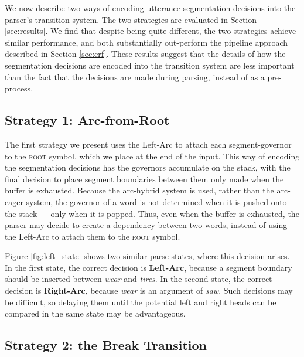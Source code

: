 \documentclass[11pt,letterpaper]{article}
\begin{document}
We now describe two ways of encoding utterance segmentation decisions into the
parser's transition system. 
The two strategies are evaluated in Section \ref{sec:results}.
We find that despite being quite different, the two strategies achieve similar
performance, and both substantially out-perform the pipeline approach described
in Section \ref{sec:crf}.  These results suggest that the details of how the
segmentation decisions are encoded into the transition system are less
important than the fact that the decisions are made during parsing, instead of
as a pre-process.

\subsection{Strategy 1: Arc-from-Root}

The first strategy we present uses the Left-Arc to attach each segment-governor
to the \textsc{root} symbol, which we place at the end of the input.
This way of encoding the segmentation decisions has the governors accumulate on
the stack, with the final decision to place segment boundaries between them only
made when the buffer is exhausted.  Because the arc-hybrid system is used, rather
than the arc-eager system, the governor of a word is not determined when it is pushed
onto the stack --- only when it is popped.  Thus, even when the buffer is exhausted,
the parser may decide to create a dependency between two words, instead of
using the Left-Arc to attach them to the \textsc{root} symbol.

Figure \ref{fig:left_state} shows two similar parse states, where this decision
arises.  In the first state, the correct decision is \textbf{Left-Arc}, because
a segment boundary should be inserted between \emph{wear} and \emph{tires}.
In the second state, the correct decision is \textbf{Right-Arc}, because
\emph{wear} is an argument of \emph{saw}.  Such decisions may be difficult,
so delaying them until the potential left and right heads can be compared in the
same state may be advantageous.

\subsection{Strategy 2: the Break Transition}
\end{document}
